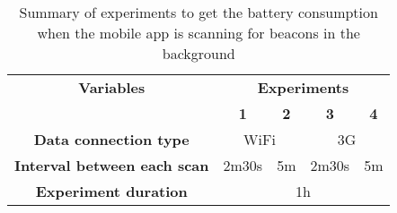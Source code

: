 \begin{table}[]
\centering
\begin{tabular}{@{}ccccc@{}}
\toprule
\textbf{Variables}                  & \multicolumn{4}{c}{\textbf{Experiments}}                                                                \\ \cmidrule{2-5}
\textbf{}                           & \textbf{1}                & \textbf{2}             & \textbf{3}                & \textbf{4}             \\ \midrule
\textbf{Data connection type}       & \multicolumn{2}{c}{WiFi}                           & \multicolumn{2}{c}{3G}                             \\
\textbf{Interval between each scan} & \multicolumn{1}{r}{2m30s} & \multicolumn{1}{r}{5m} & \multicolumn{1}{r}{2m30s} & \multicolumn{1}{r}{5m} \\
\textbf{Experiment duration}        & \multicolumn{4}{c}{1h}                                                                                  \\ \bottomrule
\end{tabular}
\caption[Battery consumption results]{Summary of experiments to get the battery consumption when the mobile
app is scanning for beacons in the background}
\label{tab:experiments_battery}
\end{table}
